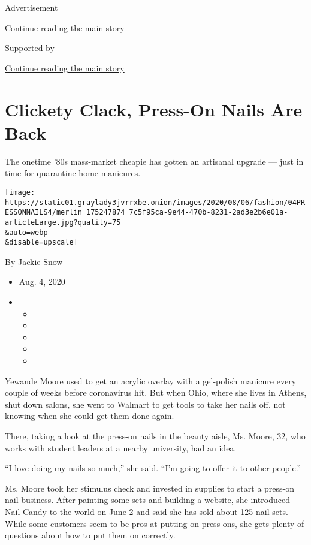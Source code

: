 Advertisement

\protect\hyperlink{after-top}{Continue reading the main story}

Supported by

\protect\hyperlink{after-sponsor}{Continue reading the main story}

\hypertarget{clickety-clack-press-on-nails-are-back}{%
\section{Clickety Clack, Press-On Nails Are
Back}\label{clickety-clack-press-on-nails-are-back}}

The onetime '80s mass-market cheapie has gotten an artisanal upgrade ---
just in time for quarantine home manicures.

\texttt{[image: https://static01.graylady3jvrrxbe.onion/images/2020/08/06/fashion/04PRESSONNAILS4/merlin\_175247874\_7c5f95ca-9e44-470b-8231-2ad3e2b6e01a-articleLarge.jpg?quality=75\\\&auto=webp\\\&disable=upscale]}

By Jackie Snow

\begin{itemize}
\item
  Aug. 4, 2020
\item
  \begin{itemize}
  \item
  \item
  \item
  \item
  \item
  \end{itemize}
\end{itemize}

Yewande Moore used to get an acrylic overlay with a gel-polish manicure
every couple of weeks before coronavirus hit. But when Ohio, where she
lives in Athens, shut down salons, she went to Walmart to get tools to
take her nails off, not knowing when she could get them done again.

There, taking a look at the press-on nails in the beauty aisle, Ms.
Moore, 32, who works with student leaders at a nearby university, had an
idea.

``I love doing my nails so much,'' she said. ``I'm going to offer it to
other people.''

Ms. Moore took her stimulus check and invested in supplies to start a
press-on nail business. After painting some sets and building a website,
she introduced \href{https://nailcandypressons.squarespace.com/}{Nail
Candy} to the world on June 2 and said she has sold about 125 nail sets.
While some customers seem to be pros at putting on press-ons, she gets
plenty of questions about how to put them on correctly.

